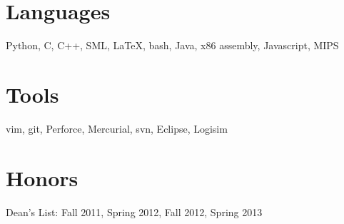 \documentclass[margin]{res}
\begin{document}
\begin{resume}
\section{Languages}
    Python, C, C++, SML, \LaTeX, bash, Java, x86 assembly, Javascript, MIPS
\section{Tools}
    vim, git, Perforce, Mercurial, svn, Eclipse, Logisim
\section{Honors}
Dean's List: Fall 2011, Spring 2012, Fall 2012, Spring 2013 \\

\end{resume}
\end{document}
